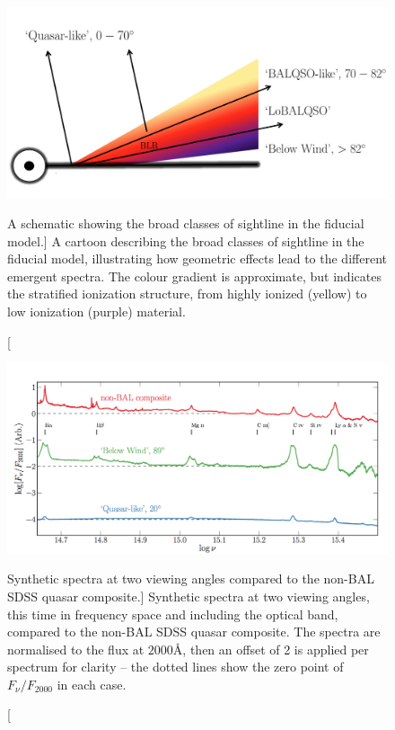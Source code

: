 \begin{figure} 
\centering
\includegraphics[width=1.0\textwidth]{figures/06-agnpaper/fig4.png}
\caption
[A schematic showing the broad classes of sightline 
in the fiducial model.]
{
A cartoon describing the broad classes of sightline 
in the fiducial model, illustrating how geometric effects lead to 
the different emergent spectra. The colour gradient is approximate,
but indicates the stratified ionization structure, 
from highly ionized (yellow) to low ionization (purple) material.
}
\label{fig:sightline}
\end{figure} 

\begin{figure}
\centering
\includegraphics[width=0.9\textheight, angle=270]
{figures/06-agnpaper/fig5.png}
\caption
[Synthetic spectra at two viewing angles compared to the non-BAL SDSS quasar composite.]
{
Synthetic spectra at two viewing angles, 
this time in frequency space and including the optical band,
compared to the non-BAL SDSS quasar composite. The spectra are normalised to the flux at 
$2000$\AA, then an offset of 2 is applied per spectrum for clarity -- the dotted lines show the zero point of $F_\nu / F_{2000}$ in each case.
}
\label{fig:sed}
\end{figure}

